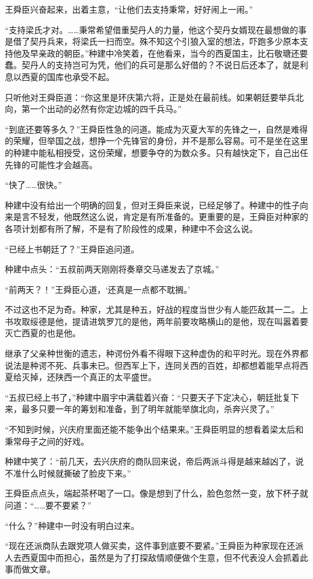王舜臣兴奋起来，出着主意，“让他们去支持秉常，好好闹上一闹。”

“支持梁氏才对。……秉常希望借重契丹人的力量，他这个契丹女婿现在最想做的事是借了契丹兵来，将梁氏一扫而空。殊不知这个引狼入室的想法，吓跑多少原本支持他及早亲政的朝臣。”种建中冷笑着，在他看来，当今的西夏国主，比石敬瑭还要蠢。契丹人的支持岂可为凭，他们的兵可是那么好借的？不说日后还本了，就是利息以西夏的国库也承受不起。

只听他对王舜臣道：“你这里是环庆第六将，正是处在最前线。如果朝廷要举兵北向，第一个出动的必然有你定边城的四千兵马。”

“到底还要等多久？”王舜臣性急的问道。能成为灭夏大军的先锋之一，自然是难得的荣耀，但举国之战，想挣一个先锋官的身份，并不是那么容易。可不是坐在这里的种建中能私相授受，这份荣耀，想要争夺的为数众多。只有越快定下，自己出任先锋的可能性才会越高。

“快了……很快。”

种建中没有给出一个明确的回复，但对王舜臣来说，已经足够了。种建中的性子向来是言不轻发，他既然这么说，肯定是有所准备的。更重要的是，王舜臣对种家的各项计划都有所了解，不是有了阶段性的成果，种建中不会这么说。

“已经上书朝廷了？”王舜臣追问道。

种建中点头：“五叔前两天刚刚将奏章交马递发去了京城。”

“前两天？！”王舜臣心道，‘还真是一点都不耽搁。’

不过这也不足为奇。种家，尤其是种五，好战的程度当世少有人能匹敌其一二。上书攻取绥德是他，提请进筑罗兀的是他，两年前要攻略横山的是他，现在叫嚣着要灭亡西夏的也是他。

继承了父亲种世衡的遗志，种谔份外看不得眼下这种虚伪的和平时光。现在外界都说法是种谔不死、兵事未已。但西军上下，连同关西的百姓，却都想着能早点将西夏给灭掉，还陕西一个真正的太平盛世。

“五叔已经上书了，”种建中眉宇中满载着兴奋：“只要天子下定决心，朝廷批复下来，最多只要一年的筹划和准备，到了明年就能举旗北向，杀奔兴灵了。”

“不知到时候，兴庆府里面还能不能争出个结果来。”王舜臣明显的想看着梁太后和秉常母子之间的好戏。

种建中笑了：“前几天，去兴庆府的商队回来说，帝后两派斗得是越来越凶了，说不准什么时候就撕破了脸皮下来。”

王舜臣点点头，端起茶杯喝了一口。像是想到了什么，脸色忽然一变，放下杯子就问道：“……要不要紧？”

“什么？”种建中一时没有明白过来。

“现在还派商队去跟党项人做买卖，这件事到底要不要紧。”王舜臣为种家现在还派人去西夏国中而担心，虽然是为了打探敌情顺便做个生意，但不代表没人会抓着此事而做文章。

